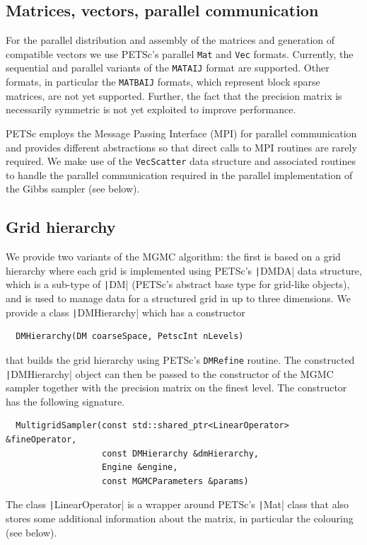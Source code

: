 \documentclass[
fontsize=11pt,
paper=a4,
numbers=noenddot
]{scrartcl}
\begin{document}
\subsection{Matrices, vectors, parallel communication}
For the parallel distribution and assembly of the matrices and generation of compatible vectors we use PETSc's parallel \texttt{Mat} and \texttt{Vec} formats. Currently, the sequential and parallel variants of the \texttt{MATAIJ} format are supported. Other formats, in particular the \texttt{MATBAIJ} formats, which represent block sparse matrices, are not yet supported. Further, the fact that the precision matrix is necessarily symmetric is not yet exploited to improve performance.

PETSc employs the Message Passing Interface (MPI) for parallel communication and provides different abstractions so that direct calls to MPI routines are rarely required. We make use of the \texttt{VecScatter} data structure and associated routines to handle the parallel communication required in the parallel implementation of the Gibbs sampler (see below).

\subsection{Grid hierarchy}
We provide two variants of the MGMC algorithm: the first is based on a grid hierarchy where each grid is implemented using PETSc's \texttt|DMDA| data structure, which is a sub-type of \texttt|DM| (PETSc's abstract base type for grid-like objects), and is used to manage data for a structured grid in up to three dimensions. We provide a class \texttt|DMHierarchy| which has a constructor
\begin{verbatim}
  DMHierarchy(DM coarseSpace, PetscInt nLevels)
\end{verbatim}
that builds the grid hierarchy using PETSc's \texttt{DMRefine} routine. The constructed \texttt|DMHierarchy| object can then be passed to the constructor of the MGMC sampler together with the precision matrix on the finest level. The constructor has the following signature.
\begin{verbatim}
  MultigridSampler(const std::shared_ptr<LinearOperator> &fineOperator,
                   const DMHierarchy &dmHierarchy,
                   Engine &engine,
                   const MGMCParameters &params)
\end{verbatim}
The class \texttt|LinearOperator| is a wrapper around PETSc's \texttt|Mat| class that also stores some additional information about the matrix, in particular the colouring (see below).
\end{document}

